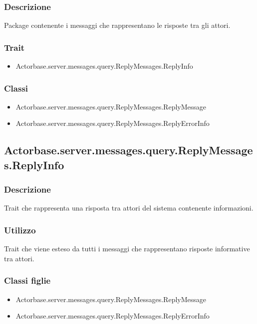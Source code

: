 \documentclass[a4paper]{article}
\begin{document}
			\subsubsection{Descrizione}
				Package contenente i messaggi che rappresentano le risposte tra gli attori.
				
			\subsubsection{Trait}
				\begin{itemize}
					\item Actorbase.server.messages.query.ReplyMessages.ReplyInfo
				\end{itemize}
				
				\subsubsection{Classi}
				\begin{itemize}
					\item Actorbase.server.messages.query.ReplyMessages.ReplyMessage
					\item Actorbase.server.messages.query.ReplyMessages.ReplyErrorInfo
				\end{itemize}
				
		\subsection{Actorbase.server.messages.query.ReplyMessages.ReplyInfo}
			\subsubsection{Descrizione}
				Trait che rappresenta una risposta tra attori del sistema contenente informazioni.
				
			\subsubsection{Utilizzo}
				Trait che viene esteso da tutti i messaggi che rappresentano risposte informative tra attori.
				
			\subsubsection{Classi figlie}
				\begin{itemize}
					\item Actorbase.server.messages.query.ReplyMessages.ReplyMessage
					\item Actorbase.server.messages.query.ReplyMessages.ReplyErrorInfo
				\end{itemize}
				
\end{document}

